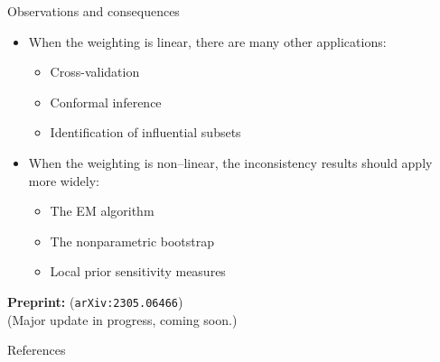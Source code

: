 \begin{frame}{Observations and consequences}
\pause
\begin{itemize}
    \item When the weighting is linear, there are many other applications:
    \begin{itemize}
        \item Cross-validation
        \item Conformal inference
        \item Identification of influential subsets
    \end{itemize}
    \item When the weighting is non--linear, the inconsistency results 
    should apply more widely:
    \begin{itemize}
        \item The EM algorithm
        \item The nonparametric bootstrap
        \item Local prior sensitivity measures
    \end{itemize}
\end{itemize}

\pause
\textbf{Preprint: }\citet{giordano:2023:bayesij} (\texttt{arXiv:2305.06466})\\
(Major update in progress, coming soon.)
    
\end{frame}




\begin{frame}{References}

\footnotesize


\begingroup
\renewcommand{\section}[2]{}%

\endgroup

%
\end{frame}
